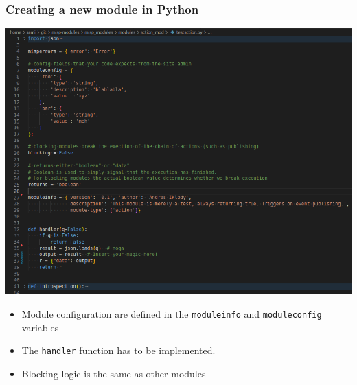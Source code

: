 \begin{frame}
    \frametitle{Creating a new module in Python}
    \begin{center}
        \includegraphics[width=0.65\linewidth]{pictures/custom-2.png}
    \end{center}

    \begin{itemize}
        \item Module configuration are defined in the \texttt{moduleinfo} and \texttt{moduleconfig} variables
        \item The \texttt{handler} function has to be implemented.
        \item Blocking logic is the same as other modules
    \end{itemize}
\end{frame}

